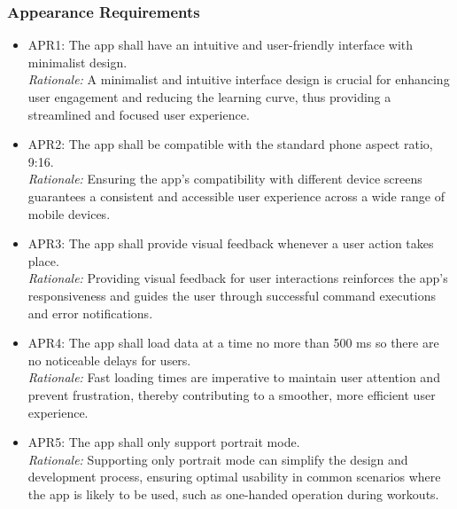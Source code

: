 \documentclass[12pt]{article}
\begin{document}
\subsubsection{Appearance Requirements}
\begin{itemize}
\item APR1: The app shall have an intuitive and user-friendly interface with minimalist design.\\
\textit{Rationale:} A minimalist and intuitive interface design is crucial for enhancing user engagement and reducing the learning curve, thus providing a streamlined and focused user experience.
\item APR2: The app shall be compatible with the standard phone aspect ratio, 9:16.\\
\textit{Rationale:} Ensuring the app’s compatibility with different device screens guarantees a consistent and accessible user experience across a wide range of mobile devices.
\item APR3: The app shall provide visual feedback whenever a user action takes place.\\
\textit{Rationale:} Providing visual feedback for user interactions reinforces the app's responsiveness and guides the user through successful command executions and error notifications.
\item APR4: The app shall load data at a time no more than 500 ms so there are no noticeable delays for users.\\
\textit{Rationale:} Fast loading times are imperative to maintain user attention and prevent frustration, thereby contributing to a smoother, more efficient user experience.
\item APR5: The app shall only support portrait mode.\\
\textit{Rationale:} Supporting only portrait mode can simplify the design and development process, ensuring optimal usability in common scenarios where the app is likely to be used, such as one-handed operation during workouts.
\end{itemize}
\end{document}
